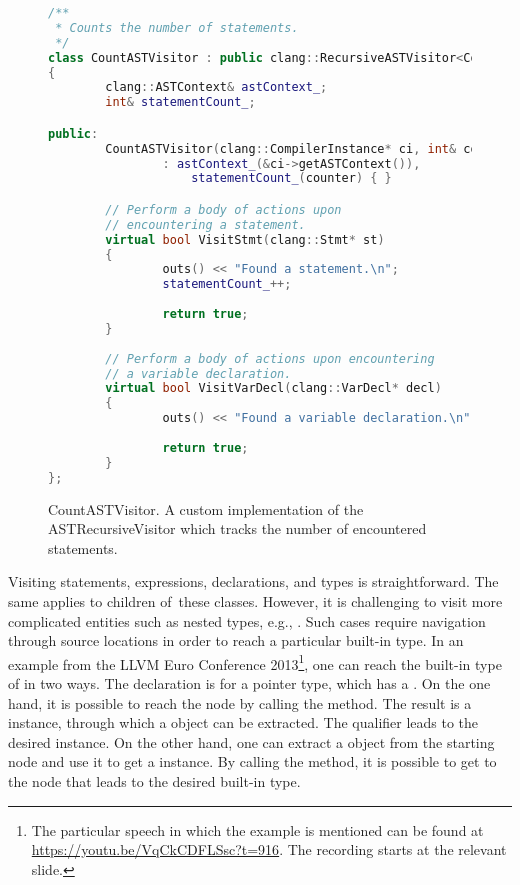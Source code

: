 \begin{figure}[ht]\centering
\begin{lstlisting}[language=C++]
/**
 * Counts the number of statements.
 */
class CountASTVisitor : public clang::RecursiveASTVisitor<CountASTVisitor>
{
        clang::ASTContext& astContext_;
        int& statementCount_;

public:
        CountASTVisitor(clang::CompilerInstance* ci, int& counter)
                : astContext_(&ci->getASTContext()), 
					statementCount_(counter) { }

		// Perform a body of actions upon 
		// encountering a statement.
        virtual bool VisitStmt(clang::Stmt* st)
        {
                outs() << "Found a statement.\n";
				statementCount_++;
				
                return true;
        }
		
		// Perform a body of actions upon encountering 
		// a variable declaration.
		virtual bool VisitVarDecl(clang::VarDecl* decl)
        {
                outs() << "Found a variable declaration.\n";
				
                return true;
        }
};
\end{lstlisting}
\caption{CountASTVisitor. A custom implementation of the ASTRecursiveVisitor
which tracks the number of encountered statements.}
\label{lst:countvisitor}
\end{figure}

Visiting statements, expressions, declarations, 
and types is straightforward. 
The same applies to children of~these classes. 
However, it is challenging to visit more complicated entities 
such as nested types, e.g., . 
Such cases require navigation through source locations in order to reach 
a particular built-in type.
In an example from the LLVM Euro Conference 2013\footnote{The particular 
speech in which the example is mentioned can be found 
at \url{https://youtu.be/VqCkCDFLSsc?t=916}. The recording starts at
the relevant slide.}, 
one can reach the built-in type of  in two ways. 
The declaration is for a pointer type, which has a . 
On the one hand, it is possible to reach the  node by 
calling the  method. 
The result is a  instance, through which 
a  object can be extracted. 
The qualifier leads to the desired  instance. 
On the other hand, one can extract a  object from 
the starting  node and use it to get 
a  instance. 
By calling the  method, it is possible to get to 
the  node that leads to the desired built-in type. 

